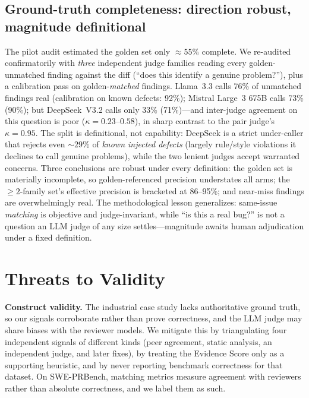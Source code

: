 \documentclass[conference]{IEEEtran}
\begin{document}
\subsection{Ground-truth completeness: direction robust, magnitude
definitional}
\label{sec:completeness}
The pilot audit estimated the golden set only ${\approx}55\%$ complete. We
re-audited confirmatorily with \emph{three} independent judge families
reading every golden-unmatched finding against the diff (``does this
identify a genuine problem?''), plus a calibration pass on
golden-\emph{matched} findings. Llama~3.3 calls 76\% of unmatched findings
real (calibration on known defects: 92\%); Mistral Large~3 675B calls 73\%
(90\%); but DeepSeek~V3.2 calls only 33\% (71\%)---and inter-judge
agreement on this question is poor ($\kappa{=}0.23$--$0.58$), in sharp
contrast to the pair judge's $\kappa{=}0.95$. The split is definitional,
not capability: DeepSeek is a strict under-caller that rejects even
${\sim}29\%$ of \emph{known injected defects} (largely rule/style
violations it declines to call genuine problems), while the two lenient
judges accept warranted concerns. Three conclusions are robust under every
definition: the golden set is materially incomplete, so golden-referenced
precision understates all arms; the ${\geq}2$-family set's effective
precision is bracketed at 86--95\%; and near-miss findings are
overwhelmingly real. The methodological lesson generalizes: same-issue
\emph{matching} is objective and judge-invariant, while ``is this a real
bug?'' is not a question an LLM judge of any size settles---magnitude
awaits human adjudication under a fixed definition.

\section{Threats to Validity}

\textbf{Construct validity.} The industrial case study lacks authoritative
ground truth, so our signals corroborate rather than prove correctness, and
the LLM judge may share biases with the reviewer models. We mitigate this by
triangulating four independent signals of different kinds (peer agreement,
static analysis, an independent judge, and later fixes), by treating the
Evidence Score only as a supporting heuristic, and by never reporting
benchmark correctness for that dataset. On SWE-PRBench, matching metrics
measure agreement with reviewers rather than absolute correctness, and we
label them as such.
\end{document}

